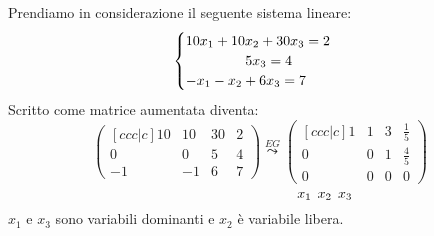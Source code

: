 \documentclass[a4paper]{article}
\theoremstyle{break}
\theoremstyle{break}
\theoremstyle{break}
\theoremstyle{break}
\begin{document}
\begin{example}
Prendiamo in considerazione il seguente sistema lineare:
\[
\begin{cases}
  10x_1 + 10x_2 + 30x_3 = 2 \\
  \hspace{1.5cm} 5x_3 = 4   \\
  -x_1 - x_2 + 6x_3 = 7
\end{cases}
\]
Scritto come matrice aumentata diventa:
\[
\begin{pmatrix}[ccc|c]
  10 & 10 & 30 & 2 \\
  0  & 0  & 5  & 4 \\
  -1 & -1 & 6  & 7
\end{pmatrix}
\stackrel{EG}{\leadsto}
\begin{pmatrix}[ccc|c]
  1 & 1 & 3 & \frac{1}{5} \\
  0 & 0 & 1 & \frac{4}{5} \\
  0 & 0 & 0 & 0
\end{pmatrix}
\]
\[
\hspace{3.3cm} x_1 \;\, x_2 \;\, x_3
\]
\( x_1 \) e \( x_3 \) sono variabili dominanti e \( x_2 \) è variabile libera.
\end{example}
\end{document}
